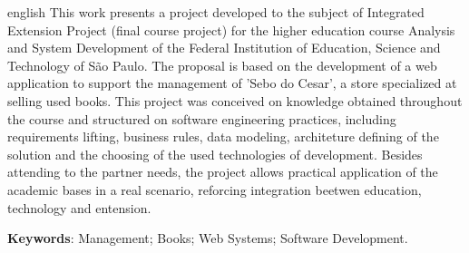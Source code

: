 \begin{resumo}[Abstract]			%
\begin{otherlanguage*}{english}		%
This work presents a project developed to the subject of Integrated Extension Project (final course project) for the higher education course Analysis and System Development of the Federal Institution of Education, Science and Technology of São Paulo. The proposal is based on the development of a web application to support the management of 'Sebo do Cesar', a store specialized at selling used books. This project was conceived on knowledge obtained throughout the course and structured on software engineering practices, including requirements lifting, business rules, data modeling, architeture defining of the solution and the choosing of the used technologies of development. Besides attending to the partner needs, the project allows practical application of the academic bases in a real scenario, reforcing integration beetwen education, technology and entension.
\vspace{\onelineskip}
\noindent

\textbf{Keywords}: Management; Books; Web Systems; Software Development.
\end{otherlanguage*}
\end{resumo}

% 

%  
